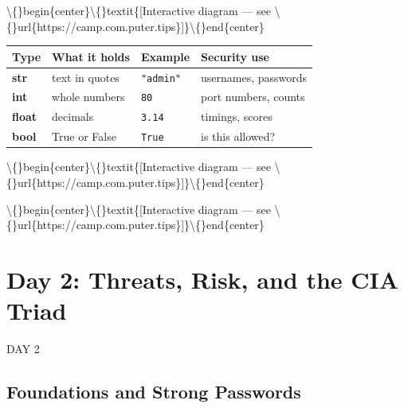 \documentclass[12pt,openany]{book}
\begin{document}
\textbackslash\{\}begin\{center\}\textbackslash\{\}textit\{[Interactive diagram --- see \textbackslash\{\}url\{https://camp.com.puter.tips\}]\}\textbackslash\{\}end\{center\}





\begin{center}\small\begin{tabular}{p{3.2cm}p{3.2cm}p{3.2cm}p{3.2cm}}\toprule
\textbf{Type} & \textbf{What it holds} & \textbf{Example} & \textbf{Security use} \\ \midrule
\textbf{str} & text in quotes & \texttt{"admin"} & usernames, passwords \\
\textbf{int} & whole numbers & \texttt{80} & port numbers, counts \\
\textbf{float} & decimals & \texttt{3.14} & timings, scores \\
\textbf{bool} & True or False & \texttt{True} & is this allowed? \\
\bottomrule\end{tabular}\end{center}







\textbackslash\{\}begin\{center\}\textbackslash\{\}textit\{[Interactive diagram --- see \textbackslash\{\}url\{https://camp.com.puter.tips\}]\}\textbackslash\{\}end\{center\}















\textbackslash\{\}begin\{center\}\textbackslash\{\}textit\{[Interactive diagram --- see \textbackslash\{\}url\{https://camp.com.puter.tips\}]\}\textbackslash\{\}end\{center\}









\chapter{Day 2: Threats, Risk, and the CIA Triad}
DAY 2


\section*{Foundations and Strong Passwords}
\end{document}
